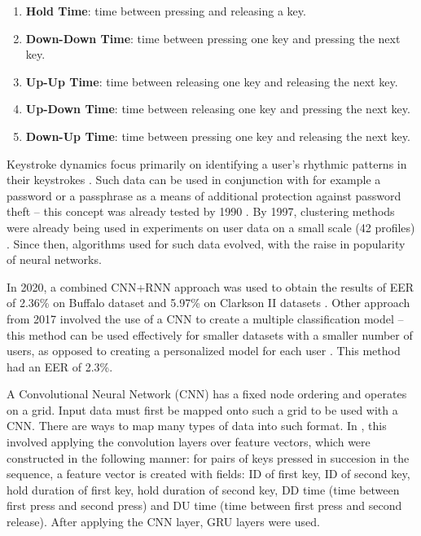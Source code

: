\begin{enumerate}
    \item \textbf{Hold Time}: time between pressing and releasing a key.
    \item \textbf{Down-Down Time}: time between pressing one key and pressing the next key.
    \item \textbf{Up-Up Time}: time between releasing one key and releasing the next key.
    \item \textbf{Up-Down Time}: time between releasing one key and pressing the next key.
    \item \textbf{Down-Up Time}: time between pressing one key and releasing the next key.
\end{enumerate}

Keystroke dynamics focus primarily on identifying a user's rhythmic patterns in their keystrokes \cite{Lu2020}. Such data can be used in conjunction with for example a password or a passphrase as a means of additional protection against password theft -- this concept was already tested by 1990 \cite{joyce1990keystroke}. By 1997, clustering methods were already being used in experiments on user data on a small scale (42 profiles) \cite{Monr1997}. Since then, algorithms used for such data evolved, with the raise in popularity of neural networks.

In 2020, a combined CNN+RNN approach was used to obtain the results of EER of 2.36\% on Buffalo dataset and 5.97\% on Clarkson II datasets \cite{Lu2020}. Other approach from 2017 involved the use of a CNN to create a multiple classification model -- this method can be used effectively for smaller datasets with a smaller number of users, as opposed to creating a personalized model for each user \cite{ceker_cnn2017}\cite{Lu2020}. This method had an EER of 2.3\%. 

A Convolutional Neural Network (CNN) has a fixed node ordering and operates on a grid. Input data must first be mapped onto such a grid to be used with a CNN. There are ways to map many types of data into such format. In \cite{Lu2020}, this involved applying the convolution layers over feature vectors, which were constructed in the following manner: for pairs of keys pressed in succesion in the sequence, a feature vector is created with fields: ID of first key, ID of second key, hold duration of first key, hold duration of second key, DD time (time between first press and second press) and DU time (time between first press and second release). After applying the CNN layer, GRU layers were used.

